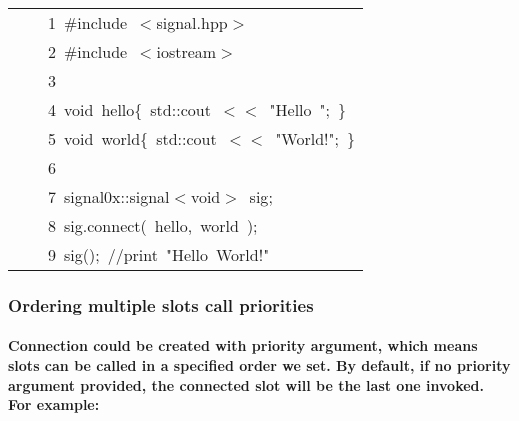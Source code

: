 \documentclass[9pt,onside,a4paper]{article}
\newcommand{\hlstd}[1]{\textcolor[rgb]{0.2,0,0.4}{#1}}
\newcommand{\hlstr}[1]{\textcolor[rgb]{0.09,0.38,0.65}{#1}}
\newcommand{\hlslc}[1]{\textcolor[rgb]{0,0.4,0.2}{#1}}
\newcommand{\hlppc}[1]{\textcolor[rgb]{0.33,0.45,0.69}{#1}}
\newcommand{\hlopt}[1]{\textcolor[rgb]{0.33,0.33,0.33}{#1}}
\newcommand{\hllin}[1]{\textcolor[rgb]{0.6,0.6,0.6}{#1}}
\newcommand{\hlkwb}[1]{\textcolor[rgb]{0.96,0.55,0.14}{#1}}
\newcommand{\hlkwd}[1]{\textcolor[rgb]{0.82,0.11,0.93}{#1}}
\begin{document}
\ttfamily
\begin{center}
\begin{xtabular}{||l||}
\hline
\hlstd{}\hllin{\ \ \ \ 1\ }\hlppc{\#include\ $<$signal.hpp$>$}\\
\hllin{\ \ \ \ 2\ }\hlstd{}\hlppc{\#include\ $<$iostream$>$}\\
\hllin{\ \ \ \ 3\ }\hlstd{}\\
\hllin{\ \ \ \ 4\ }\hlkwb{void\ }\hlstd{hello}\hlopt{\{\ }\hlstd{std}\hlopt{::}\hlstd{cout\ }\hlopt{$<$$<$\ }\hlstd{}\hlstr{"Hello\ "}\hlstd{}\hlopt{;\ \}}\\
\hllin{\ \ \ \ 5\ }\hlstd{}\hlkwb{void\ }\hlstd{world}\hlopt{\{\ }\hlstd{std}\hlopt{::}\hlstd{cout\ }\hlopt{$<$$<$\ }\hlstd{}\hlstr{"World!"}\hlstd{}\hlopt{;\ \}}\\
\hllin{\ \ \ \ 6\ }\hlstd{}\\
\hllin{\ \ \ \ 7\ }\hlstd{signal0x}\hlopt{::}\hlstd{signal}\hlopt{$<$}\hlstd{}\hlkwb{void}\hlstd{}\hlopt{$>$\ }\hlstd{sig}\hlopt{;}\\
\hllin{\ \ \ \ 8\ }\hlstd{sig}\hlopt{.}\hlstd{}\hlkwd{connect}\hlstd{}\hlopt{(\ }\hlstd{hello}\hlopt{,\ }\hlstd{world\ }\hlopt{);}\\
\hllin{\ \ \ \ 9\ }\hlstd{}\hlkwd{sig}\hlstd{}\hlopt{();\ }\hlstd{}\hlslc{//print\ "Hello\ World!"}\hlstd{}\\
\hline
\end{xtabular}
\end{center}
\normalfont
\normalsize

\subsubsection{Ordering multiple slots call priorities}

\paragraph{Connection could be created with priority argument, which means slots can be called in a specified order we set. By default,
    if no priority argument provided, the connected slot will be the last one invoked. For example:}
\end{document}
